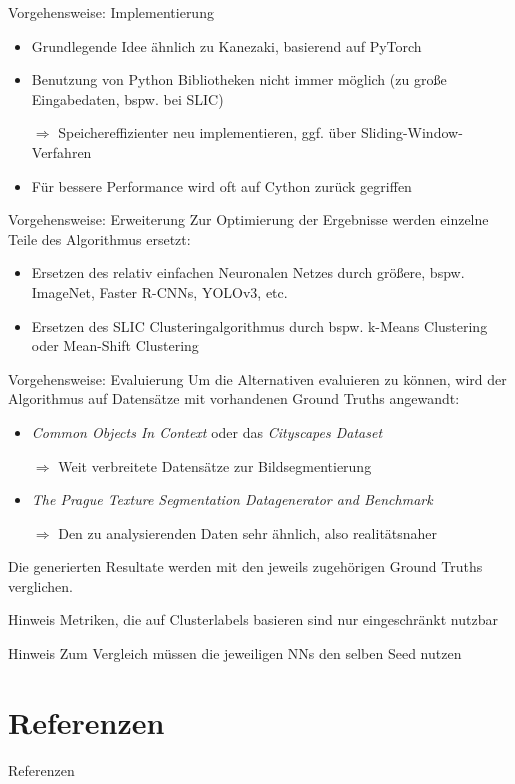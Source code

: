 \documentclass[9pt]{beamer}
\begin{document}
\begin{frame}{Vorgehensweise: Implementierung}
\begin{itemize}
	\item Grundlegende Idee ähnlich zu Kanezaki\cite{kanezaki2018_unsupervised_segmentation}, basierend auf PyTorch
	\item Benutzung von Python Bibliotheken nicht immer möglich (zu große Eingabedaten, bspw. bei SLIC\cite{slic})
	\item[$\Rightarrow$] Speichereffizienter neu implementieren, ggf. über Sliding-Window-Verfahren
	\item Für bessere Performance wird oft auf Cython\cite{behnel2010cython} zurück gegriffen
\end{itemize}	
\end{frame}

\begin{frame}{Vorgehensweise: Erweiterung}
Zur Optimierung der Ergebnisse werden einzelne Teile des Algorithmus ersetzt:
\begin{itemize}
	\item Ersetzen des relativ einfachen Neuronalen Netzes durch größere, bspw. ImageNet, Faster R-CNNs, YOLOv3, etc.
	\item Ersetzen des SLIC Clusteringalgorithmus durch bspw. k-Means Clustering oder Mean-Shift Clustering
\end{itemize}	
\end{frame}

\begin{frame}{Vorgehensweise: Evaluierung}
Um die Alternativen evaluieren zu können, wird der Algorithmus auf Datensätze mit vorhandenen Ground Truths angewandt:
\medskip
\begin{itemize}
	\item \textit{Common Objects In Context}\cite{LMBHPRDZ:ECCV:2014} oder das \textit{Cityscapes Dataset}\cite{Cordts2016Cityscapes}
	\item[$\Rightarrow$] Weit verbreitete Datensätze zur Bildsegmentierung
	\medskip
	\item \textit{The Prague Texture Segmentation Datagenerator and Benchmark}\cite{mikevs2015benchmarking}
	\item[$\Rightarrow$] Den zu analysierenden Daten sehr ähnlich, also realitätsnaher
\end{itemize}

Die generierten Resultate werden mit den jeweils zugehörigen Ground Truths verglichen.
\pause
\begin{block}{Hinweis}
	Metriken, die auf Clusterlabels basieren sind nur eingeschränkt nutzbar
\end{block}
\pause
\begin{block}{Hinweis}
	Zum Vergleich müssen die jeweiligen NNs den selben Seed nutzen
\end{block}
\end{frame}

\section{Referenzen}

\begin{frame}{Referenzen}
	
	
\end{frame}

	
\end{document}
